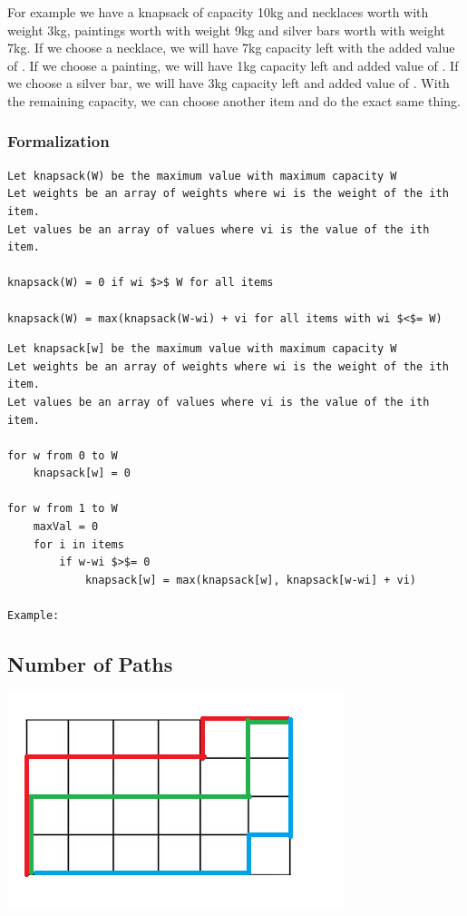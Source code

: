\documentclass[11pt,oneside]{book}
\makeatletter
\def\maxwidth#1{\ifdim\Gin@nat@width>#1 #1\else\Gin@nat@width\fi}
\makeatother
\begin{document}
For example we have a knapsack of capacity 10kg and necklaces worth  with weight 3kg, paintings worth  with weight 9kg and silver bars worth  with weight 7kg. If we choose a necklace, we will have 7kg capacity left with the added value of . If we choose a painting, we will have 1kg capacity left and added value of . If we choose a silver bar, we will have 3kg capacity left and added value of . With the remaining capacity, we can choose another item and do the exact same thing.

\subsubsection{Formalization}

\begin{lstlisting}
Let knapsack(W) be the maximum value with maximum capacity W
Let weights be an array of weights where wi is the weight of the ith item.
Let values be an array of values where vi is the value of the ith item.

knapsack(W) = 0 if wi $>$ W for all items

knapsack(W) = max(knapsack(W-wi) + vi for all items with wi $<$= W)
\end{lstlisting}

\begin{lstlisting}
Let knapsack[w] be the maximum value with maximum capacity W
Let weights be an array of weights where wi is the weight of the ith item.
Let values be an array of values where vi is the value of the ith item.

for w from 0 to W
    knapsack[w] = 0

for w from 1 to W
    maxVal = 0
    for i in items
        if w-wi $>$= 0
            knapsack[w] = max(knapsack[w], knapsack[w-wi] + vi)

Example:

\end{lstlisting}

\subsection{Number of Paths}

\includegraphics[width=\maxwidth{\textwidth}]{recursion_grid.png}
\end{document}
